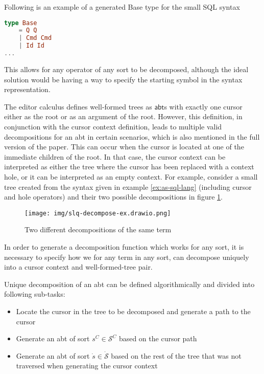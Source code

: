 \documentclass[sigplan,review]{acmart}
\newcommand{\abt}{\textsf{abt}\xspace}
\begin{document}
\begin{example}\label{ex:c-spec}
Following is an example of a generated Base type for the small SQL syntax
  \begin{lstlisting}[language=elm,style=examplestyle]
type Base
    = Q Q
    | Cmd Cmd
    | Id Id
...
\end{lstlisting}
\end{example}

This allows for any operator
of any sort to be decomposed, although the ideal solution would be having
a way to specify the starting symbol in the syntax representation.

The editor calculus defines well-formed trees as $\abt$s
with exactly one cursor either as the root or as an argument of the root.
However, this definition, in conjunction with the cursor context definition,
leads to multiple valid decompositions for an \abt in certain scenarios,
which is also mentioned in the full version of the paper. This can occur when the cursor is located
at one of the immediate children of the root. In that case, the cursor context
can be interpreted as either the tree where the cursor has been replaced with a
context hole, or it can be interpreted as an empty context.
For example, consider a small tree created from the syntax given in
example \cref{ex:as-sql-lang} (including cursor and hole operators) and
their two possible decompositions in figure \cref{fig:sql-decomp-ex}.


\begin{figure}[H]
  \centering
  \texttt{[image: img/slq-decompose-ex.drawio.png]}
  \caption{Two different decompositions of the same term}
  \label{fig:sql-decomp-ex}
\end{figure}

In order to generate a decomposition function which works for any sort,
it is necessary to specify how we for any term in any sort,
can decompose uniquely into a cursor context and well-formed-tree pair.

Unique decomposition of an \abt can be defined algorithmically and divided
into following sub-tasks:
\begin{itemize}
  \item Locate the cursor in the tree to be decomposed and generate a path to the cursor
  \item Generate an \abt of sort $s^C \in \mathcal{S}^C$ based on the cursor path
  \item Generate an \abt of sort $\dot{s} \in \dot{\mathcal{S}}$
        based on the rest of the tree that was not traversed
        when generating the cursor context
\end{itemize}
\end{document}
